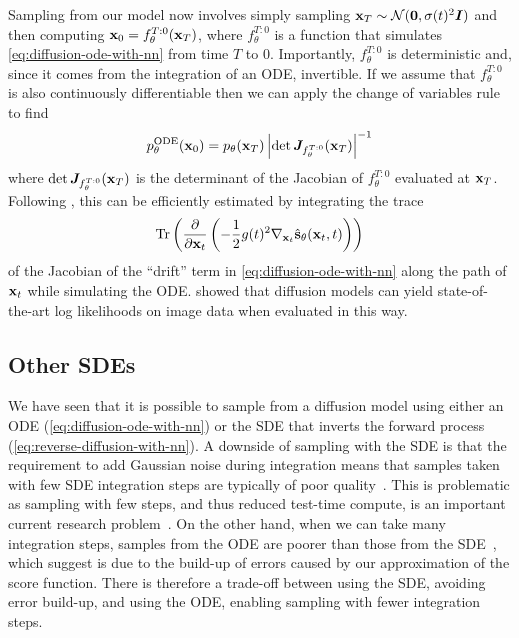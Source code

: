 Sampling from our model now involves simply sampling ${\mathbf{x}}_T \sim {\mathcal{N}}({\bm{0}}, \sigma(t)^2{\bm{I}})$ and then computing ${\mathbf{x}}_0 = f^{T:0}_\theta({\mathbf{x}}_T)$, where $f^{T:0}_\theta$ is a function that simulates \cref{eq:diffusion-ode-with-nn} from time $T$ to $0$. Importantly, $f^{T:0}_\theta$ is deterministic and, since it comes from the integration of an ODE, invertible. If we assume that $f^{T:0}_\theta$ is also continuously differentiable then we can apply the change of variables rule to find
\begin{equation}
    p_\theta^\text{ODE}({\mathbf{x}}_0) = p_\theta({\mathbf{x}}_T) \left| \det {\bm{J}}_{f^{T:0}_\theta}({\mathbf{x}}_T) \right|^{-1}
\end{equation}
where $\det {\bm{J}}_{f^{T:0}_\theta}({\mathbf{x}}_T)$ is the determinant of the Jacobian of $f^{T:0}_\theta$ evaluated at ${\mathbf{x}}_T$. Following \citet{chen2018neural}, this can be efficiently estimated by integrating the trace
\begin{equation}
    \text{Tr}\left( \frac{\partial}{\partial {\mathbf{x}}_t} \left( - \frac{1}{2} g(t)^2 \nabla_{{\mathbf{x}}_t} \hat{{\mathbf{s}}}_\theta({\mathbf{x}}_t, t) \right)
    \right)
\end{equation}
of the Jacobian of the ``drift'' term in \cref{eq:diffusion-ode-with-nn} along the path of ${\mathbf{x}}_t$ while simulating the ODE. \citet{song2020score} showed that diffusion models can yield state-of-the-art log likelihoods on image data when evaluated in this way.

\subsection{Other SDEs}
We have seen that it is possible to sample from a diffusion model using either an ODE (\cref{eq:diffusion-ode-with-nn}) or the SDE that inverts the forward process (\cref{eq:reverse-diffusion-with-nn}). A downside of sampling with the SDE is that the requirement to add Gaussian noise during integration means that samples taken with few SDE integration steps are typically of poor quality~\citep{song2020denoising,karras2022elucidating}. This is problematic as sampling with few steps, and thus reduced test-time compute, is an important current research problem~\citep{salimans2022progressive,meng2022distillation,esser2024scaling}. On the other hand, when we can take many integration steps, samples from the ODE are poorer than those from the SDE~\citep{song2020denoising}, which \citet{karras2022elucidating} suggest is due to the build-up of errors caused by our approximation of the score function. There is therefore a trade-off between using the SDE, avoiding error build-up, and using the ODE, enabling sampling with fewer integration steps.

